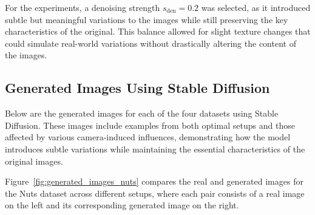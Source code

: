 \documentclass[12pt,DIV14,BCOR12mm,a4paper,footinclude=false,headinclude,parskip=half-,twoside,openright,cleardoublepage=empty,toc=index,bibliography=totoc,listof=totoc]{scrreprt}
\numberwithin{equation}{chapter}
\begin{document}
For the experiments, a denoising strength $s_{\text{den}} = 0.2$ was selected, as it introduced subtle but meaningful variations to the images while still preserving the key characteristics of the original. This balance allowed for slight texture changes that could simulate real-world variations without drastically altering the content of the images.

\subsection{Generated Images Using Stable Diffusion}
\label{sec:generated_images}
Below are the generated images for each of the four datasets using Stable Diffusion. These images include examples from both optimal setups and those affected by various camera-induced influences, demonstrating how the model introduces subtle variations while maintaining the essential characteristics of the original images.

Figure~\ref{fig:generated_images_nuts} compares the real and generated images for the Nuts dataset across different setups, where each pair consists of a real image on the left and its corresponding generated image on the right.
\end{document}
